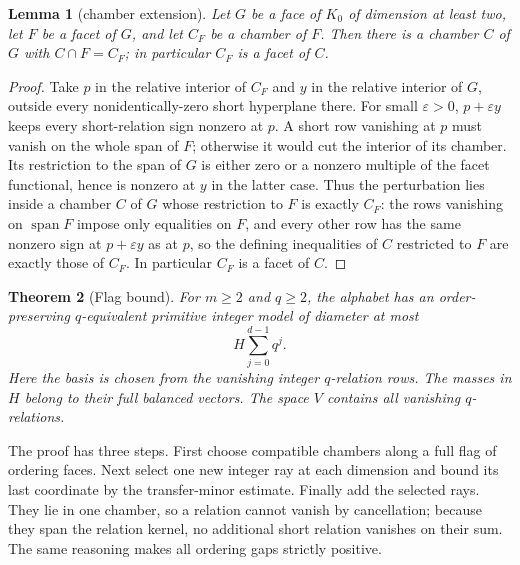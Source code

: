 \documentclass[11pt,reqno]{amsart}
\theoremstyle{plain}
\newtheorem{theorem}{Theorem}[section]
\newtheorem{lemma}[theorem]{Lemma}
\theoremstyle{definition}
\theoremstyle{plain}
\newcommand{\spn}{\operatorname{span}}
\theoremstyle{plain}
\theoremstyle{plain}
\theoremstyle{plain}
\theoremstyle{plain}
\theoremstyle{plain}
\theoremstyle{definition}
\theoremstyle{definition}
\theoremstyle{definition}
\theoremstyle{plain}
\begin{document}
\begin{lemma}[chamber extension]\label{M-lem:chamber-extension}
Let $G$ be a face of $K_0$ of dimension at least two, let $F$ be a facet of
$G$, and let $C_F$ be a chamber of $F$. Then there is a chamber $C$ of $G$
with $C\cap F=C_F$; in particular $C_F$ is a facet of $C$.
\end{lemma}
\begin{proof}
Take $p$ in the relative interior of $C_F$ and $y$ in the relative interior
of $G$, outside every nonidentically-zero short hyperplane there. For small
$\varepsilon>0$, $p+\varepsilon y$ keeps every short-relation sign nonzero at
$p$. A short row vanishing at $p$ must vanish on the whole span of $F$;
otherwise it would cut the interior of its chamber. Its restriction to the
span of $G$ is either zero or a nonzero multiple of the facet functional,
hence is nonzero at $y$ in the latter case. Thus the perturbation lies inside
a chamber $C$ of $G$ whose restriction to $F$ is exactly $C_F$: the rows
vanishing on $\spn F$ impose only equalities on $F$, and every other row has
the same nonzero sign at $p+\varepsilon y$ as at $p$, so the defining
inequalities of $C$ restricted to $F$ are exactly those of $C_F$. In
particular $C_F$ is a facet of $C$.
\end{proof}

\begin{theorem}[Flag bound]\label{M-thmD}\label{M-thm:flag-model}
For $m\ge2$ and $q\ge2$, the alphabet has an order-preserving $q$-equivalent
primitive integer model of diameter at most
\[
 H\sum_{j=0}^{d-1}q^j.
\]
Here the basis is chosen from the vanishing integer $q$-relation rows.
The masses in $H$ belong to their full balanced vectors. The space $V$
contains all vanishing $q$-relations.
\end{theorem}
The proof has three steps. First choose compatible chambers along a full flag
of ordering faces. Next select one new integer ray at each dimension and bound
its last coordinate by the transfer-minor estimate. Finally add the selected
rays. They lie in one chamber, so a relation cannot vanish by cancellation;
because they span the relation kernel, no additional short relation vanishes
on their sum. The same reasoning makes all ordering gaps strictly positive.
\end{document}
